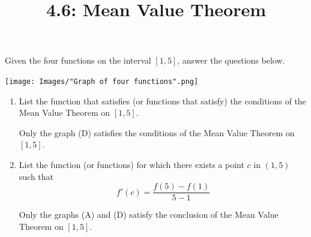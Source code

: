 \documentclass[nooutcomes]{ximera}
\title{4.6: Mean Value Theorem}
\begin{document}
\begin{abstract}		\end{abstract}
\maketitle

\begin{problem}

  Given the four functions on the interval $[1, 5]$, answer the questions below.
  \begin{image}
    \texttt{[image: Images/"Graph of four functions".png]}
  \end{image}
  \begin{enumerate}
    \item
      List the function that satisfies (or functions that satisfy) the conditions of the Mean Value Theorem on $[1, 5]$.
      \begin{freeResponse}
        Only the graph (D) satisfies the conditions of the Mean Value Theorem on $[1,5]$.
      \end{freeResponse}
    \item
      List the function (or functions) for which there exists a point $c$ in $(1, 5)$ such that 
      \[
        f'(c) = \frac{f(5) - f(1)}{5 - 1}
      \]
      \begin{freeResponse}
        Only the graphs (A) and (D) satisfy the conclusion of the Mean Value Theorem on $[1, 5]$.
      \end{freeResponse}
  \end{enumerate}
\end{problem}
\end{document}
